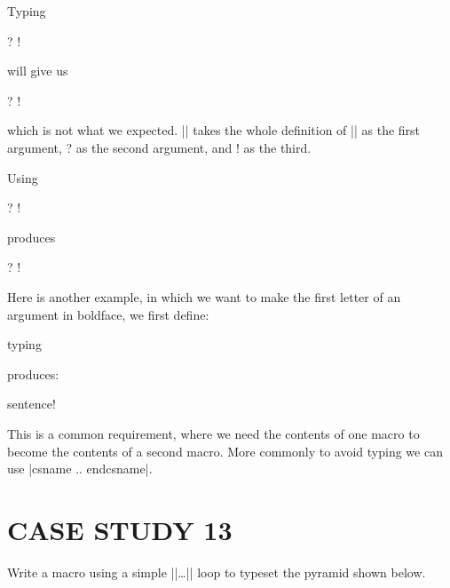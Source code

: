 \begin{teX}
Typing 

\begin{teX}
\lookatletters{} ? !
\end{teX}

will give us 

 \lookatletters{} ? !

 which is not what we expected. |\lookatletters| takes the whole definition of ||
as the first argument, ? as the second argument, and ! as
the third. 

Using 

\begin{teX}
\expandafter\lookatletters{}  ? !
\end{teX}

produces

\expandafter\lookatletters{}  ? !

\def\test{\expandafter\lookatletters\letters  ? !}
\bigskip

Here is another example, in which we want to make the first letter of an argument in boldface, we first define:
\begin{teX}
\def\nextbf#1{{\bf #1}}
\def\meintext{Example sentence!}
\end{teX}
typing
\begin{teX}
\expandafter\nextbf\meintext
\end{teX}

\def\nextbf#1{{\bf #1}}
\def\meintext{Example sentence!}

\noindent produces:

\smallskip
\expandafter\nextbf\meintext
\bigskip



This is a common requirement, where we need the contents of one macro to become the contents of
a second macro. More commonly to avoid typing we can use |csname .. endcsname|.




\chapter{CASE STUDY 13}
Write a macro using a simple |\loop|\ldots|\repeat| loop to typeset the pyramid shown below.

\topline
\def\triangle#1{{\def\bull{}%
\count1=0
\loop
   \edef\bull{$\bullet$\bull}
   \ifnum\count1<#1
      \advance\count1 by 1
      \centerline{\bull}
      \vskip-7.7pt
      \repeat
      \vskip 7.7pt\relax}}


\end{teX}
